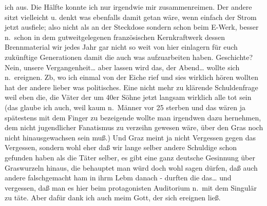 \documentclass[
]{article}
\begin{document}
ich aus. Die Hälfte konnte ich nur irgendwie mir zusammenreimen. Der
andere sitzt vielleicht u. denkt was ebenfalls damit getan wäre, wenn
einfach der Strom jetzt ausfiele; also nicht als an der Steckdose
sondern schon beim E-Werk, besser n.~schon in dem gutweitgelegenen
französischen Kernkraftwerk dessen Brennmaterial wir jedes Jahr gar
nicht so weit von hier einlagern für euch zukünftige Generationen damit
die auch was aufzuarbeiten haben. Geschichte? Nein, unsere
Vergangenheit\ldots{} aber lassen wird das, der Abend\ldots{} wollte
sich n.~ereignen. Zb, wo ich einmal von der Eiche rief und sies wirklich
hören wollten hat der andere lieber was politisches. Eine nicht mehr zu
klärende Schuldenfrage weil eben die, die Väter der um 40er Söhne jetzt
langsam wirklich alle tot sein (das glaube ich auch, weil kaum n.~Männer
vor 25 sterben und das wären ja spätestens mit dem Finger zu bezeigende
wollte man irgendwen dazu hernehmen, dem nicht jugendlicher Fanatismus
zu verzeihn gewesen wäre, über den Gras noch nicht hinausgewachsen sein
muß.) Und Graz meint ja nicht Vergessen gegen das Vergessen, sondern
wohl eher daß wir lange selber andere Schuldige schon gefunden haben als
die Täter selber, es gibt eine ganz deutsche Gesinnung über Graswurzeln
hinaus, die behauptet man würd doch wohl sagen dürfen, daß auch andere
falschgemacht ham in ihrm Lebm danach - durften die das\ldots{} und
vergessen, daß man es hier beim protagonisten Auditorium n.~mit dem
Singulär zu täte. Aber dafür dank ich auch meim Gott, der sich ereignen
ließ.
\end{document}
